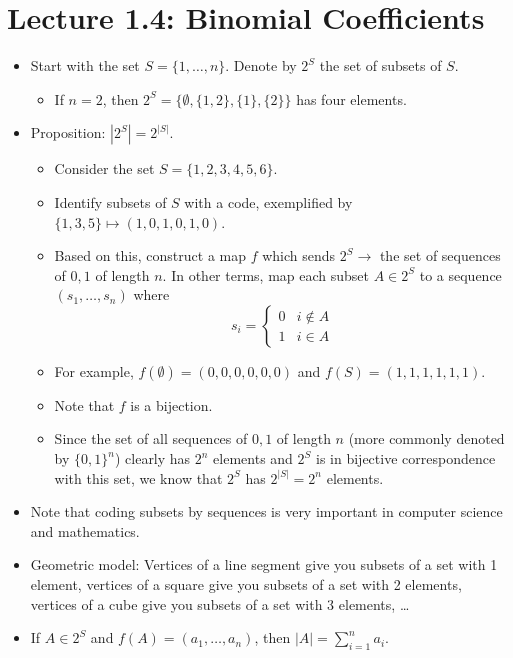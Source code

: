 \documentclass[../main.tex]{subfiles}
\begin{document}
\section{Lecture 1.4: Binomial Coefficients}
\begin{itemize}
    \item Start with the set $S=\{1,\dots,n\}$. Denote by $2^S$ the set of subsets of $S$.
    \begin{itemize}
        \item If $n=2$, then $2^S=\{\emptyset,\{1,2\},\{1\},\{2\}\}$ has four elements.
    \end{itemize}
    \item Proposition: $|2^S|=2^{|S|}$.
    \begin{itemize}
        \item Consider the set $S=\{1,2,3,4,5,6\}$.
        \item Identify subsets of $S$ with a code, exemplified by $\{1,3,5\}\mapsto(1,0,1,0,1,0)$.
        \item Based on this, construct a map $f$ which sends $2^S\to$ the set of sequences of $0,1$ of length $n$. In other terms, map each subset $A\in 2^S$ to a sequence $(s_1,\dots,s_n)$ where
        \begin{equation*}
            s_i =
            \begin{cases}
                0 & i\notin A\\
                1 & i\in A
            \end{cases}
        \end{equation*}
        \item For example, $f(\emptyset)=(0,0,0,0,0,0)$ and $f(S)=(1,1,1,1,1,1)$.
        \item Note that $f$ is a bijection.
        \item Since the set of all sequences of $0,1$ of length $n$ (more commonly denoted by $\{0,1\}^n$) clearly has $2^n$ elements and $2^S$ is in bijective correspondence with this set, we know that $2^S$ has $2^{|S|}=2^n$ elements.
    \end{itemize}
    \item Note that coding subsets by sequences is very important in computer science and mathematics.
    \item Geometric model: Vertices of a line segment give you subsets of a set with 1 element, vertices of a square give you subsets of a set with 2 elements, vertices of a cube give you subsets of a set with 3 elements, \dots
    \item If $A\in 2^S$ and $f(A)=(a_1,\dots,a_n)$, then $|A|=\sum_{i=1}^na_i$.

\end{itemize}
\end{document}
